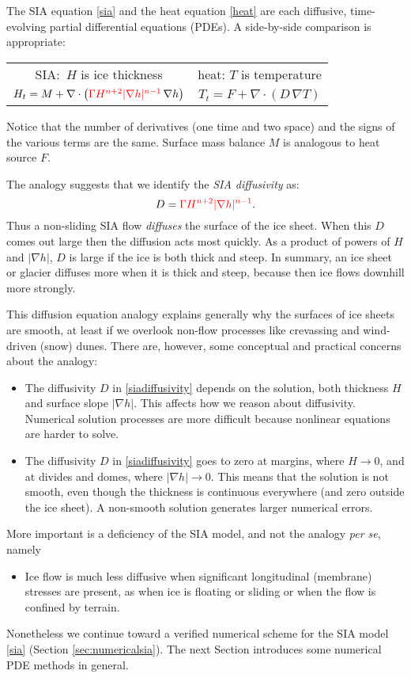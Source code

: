 \documentclass[letterpaper,final,12pt,reqno]{amsart}
\newcommand{\grad}{\nabla}
\newcommand{\Div}{\nabla\cdot}
\begin{document}
The SIA equation \eqref{sia} and the heat equation \eqref{heat} are each diffusive, time-evolving partial differential equations (PDEs).  A side-by-side comparison is appropriate:
\begin{center}
\begin{tabular}{cc}
\vspace{1mm}
SIA:\, $H$ is ice thickness & \phantom{foo bar} heat: $T$ is temperature\phantom{foo bar}  \\
\vspace{1mm}
	$H_t = M + \Div \left({\color{red}\Gamma H^{n+2} |\grad h|^{n-1}}\, \grad h \right)$  &  $T_t = F + \Div (D\, \grad T)$
\end{tabular}
\end{center}
\vspace{1mm}
Notice that the number of derivatives (one time and two space) and the signs of the various terms are the same.  Surface mass balance $M$ is analogous to heat source $F$.

The analogy suggests that we identify the \emph{SIA diffusivity} as:
\begin{equation}
	D = {\color{red}\Gamma H^{n+2} |\grad h|^{n-1}}.  \label{siadiffusivity}
\end{equation}
Thus a non-sliding SIA flow \emph{diffuses} the surface of the ice sheet.  When this $D$ comes out large then the diffusion acts most quickly.  As a product of powers of $H$ and $|\grad h|$, $D$ is large if the ice is both thick and steep.  In summary, an ice sheet or glacier diffuses more when it is thick and steep, because then ice flows downhill more strongly.

This diffusion equation analogy explains generally why the surfaces of ice sheets are smooth, at least if we overlook non-flow processes like crevassing and wind-driven (snow) dunes.  There are, however, some conceptual and practical concerns about the analogy:
\begin{itemize}
\item The diffusivity $D$ in \eqref{siadiffusivity} depends on the solution, both thickness $H$ and surface slope $|\grad h|$.  This affects how we reason about diffusivity.  Numerical solution processes are more difficult because nonlinear equations are harder to solve.
\item The diffusivity $D$ in \eqref{siadiffusivity} goes to zero at margins, where $H\to 0$, and at divides and domes, where $|\grad h|\to 0$.  This means that the solution is not smooth, even though the thickness is continuous everywhere (and zero outside the ice sheet).  A non-smooth solution generates larger numerical errors.
\end{itemize}
More important is a deficiency of the SIA model, and not the analogy \emph{per se}, namely
\begin{itemize}
\item Ice flow is much less diffusive when significant longitudinal (membrane) stresses are present, as when ice is floating or sliding or when the flow is confined by terrain.
\end{itemize}
Nonetheless we continue toward a verified numerical scheme for the SIA model \eqref{sia} (Section \ref{sec:numericalsia}).  The next Section introduces some numerical PDE methods in general.
\end{document}
